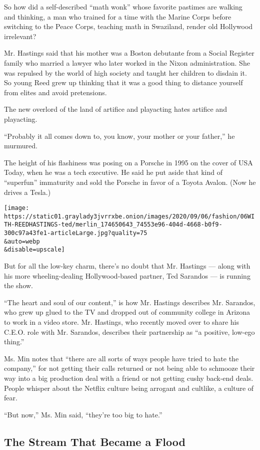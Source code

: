 So how did a self-described ``math wonk'' whose favorite pastimes are
walking and thinking, a man who trained for a time with the Marine Corps
before switching to the Peace Corps, teaching math in Swaziland, render
old Hollywood irrelevant?

Mr. Hastings said that his mother was a Boston debutante from a Social
Register family who married a lawyer who later worked in the Nixon
administration. She was repulsed by the world of high society and taught
her children to disdain it. So young Reed grew up thinking that it was a
good thing to distance yourself from elites and avoid pretensions.

The new overlord of the land of artifice and playacting hates artifice
and playacting.

``Probably it all comes down to, you know, your mother or your father,''
he murmured.

The height of his flashiness was posing on a Porsche in 1995 on the
cover of USA Today, when he was a tech executive. He said he put aside
that kind of ``superfun'' immaturity and sold the Porsche in favor of a
Toyota Avalon. (Now he drives a Tesla.)

\texttt{[image: https://static01.graylady3jvrrxbe.onion/images/2020/09/06/fashion/06WITH-REEDHASTINGS-ted/merlin\_174650643\_74553e96-404d-4668-b0f9-300c97a43fe1-articleLarge.jpg?quality=75\\\&auto=webp\\\&disable=upscale]}

But for all the low-key charm, there's no doubt that Mr. Hastings ---
along with his more wheeling-dealing Hollywood-based partner, Ted
Sarandos --- is running the show.

``The heart and soul of our content,'' is how Mr. Hastings describes Mr.
Sarandos, who grew up glued to the TV and dropped out of community
college in Arizona to work in a video store. Mr. Hastings, who recently
moved over to share his C.E.O. role with Mr. Sarandos, describes their
partnership as ``a positive, low-ego thing.''

Ms. Min notes that ``there are all sorts of ways people have tried to
hate the company,'' for not getting their calls returned or not being
able to schmooze their way into a big production deal with a friend or
not getting cushy back-end deals. People whisper about the Netflix
culture being arrogant and cultlike, a culture of fear.

``But now,'' Ms. Min said, ``they're too big to hate.''

\hypertarget{the-stream-that-became-a-flood}{%
\subsection{The Stream That Became a
Flood}\label{the-stream-that-became-a-flood}}

